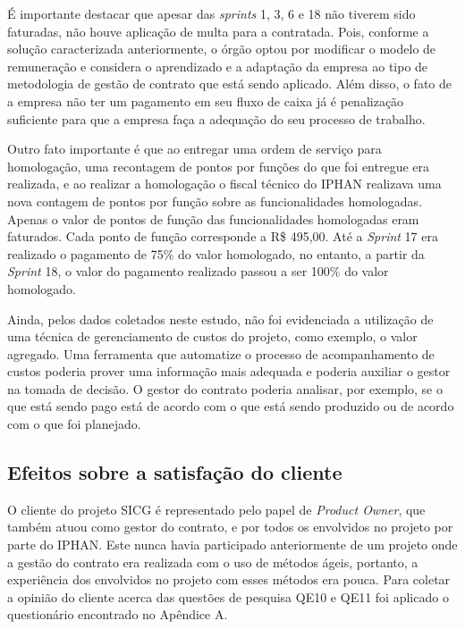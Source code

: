 É importante destacar que apesar das \textit{sprints} 1, 3, 6 e 18 não tiverem sido faturadas, não houve aplicação de multa para a contratada. Pois, conforme a solução caracterizada anteriormente, o órgão optou por modificar o modelo de remuneração e considera o aprendizado e a adaptação da empresa ao tipo de metodologia de gestão de contrato que está sendo aplicado. Além disso, o fato de a empresa não ter um pagamento em seu fluxo de caixa já é penalização suficiente para que a empresa faça a adequação do seu processo de trabalho.

Outro fato importante é que ao entregar uma ordem de serviço para homologação, uma recontagem de pontos por funções do que foi entregue era realizada, e ao realizar a homologação o fiscal técnico do IPHAN realizava uma nova contagem de pontos por função sobre as funcionalidades homologadas. Apenas o valor de pontos de função das funcionalidades homologadas eram faturados. Cada ponto de função corresponde a R\$ 495,00. Até a \textit{Sprint} 17 era realizado o pagamento de 75\% do valor homologado, no entanto, a partir da \textit{Sprint} 18, o valor do pagamento realizado passou a ser 100\% do valor homologado.

Ainda, pelos dados coletados neste estudo, não foi evidenciada a utilização de uma técnica de gerenciamento de custos do projeto, como exemplo, o valor agregado. Uma ferramenta que automatize o processo de acompanhamento de custos poderia prover uma informação mais adequada e poderia auxiliar o gestor na tomada de decisão. O gestor do contrato poderia analisar, por exemplo, se o que está sendo pago está de acordo com o que está sendo produzido ou de acordo com o que foi planejado.

\subsection[Efeitos sobre a satisfação do cliente]{Efeitos sobre a satisfação do cliente}

O cliente do projeto SICG é representado pelo papel de \textit{Product Owner}, que também atuou como gestor do contrato, e por todos os envolvidos no projeto por parte do IPHAN. Este nunca havia participado anteriormente de um projeto onde a gestão do contrato era realizada com o uso de métodos ágeis, portanto, a experiência dos envolvidos no projeto com esses métodos era pouca. Para coletar a opinião do cliente acerca das questões de pesquisa QE10  e QE11 foi aplicado o questionário encontrado no Apêndice A.

